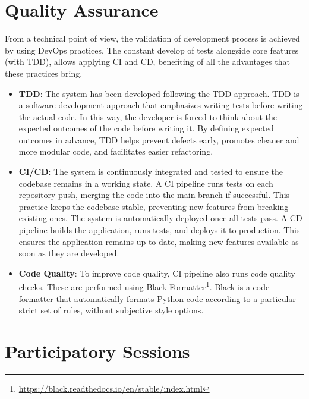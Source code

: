 \documentclass[12pt,a4paper,openright,twoside]{book}
\begin{document}
\section{Quality Assurance}

From a technical point of view, the validation of development process is achieved by using DevOps practices.
%
The constant develop of tests alongside core features (with \ac{TDD}), allows applying \ac{CI} and \acf{CD}, benefiting of all the advantages that these practices bring.

\begin{itemize}[label={}]
    \item \textbf{\acl{TDD}}:
    The system has been developed following the \ac{TDD} approach.
    \ac{TDD} is a software development approach that emphasizes writing tests before writing the actual code.
    In this way, the developer is forced to think about the expected outcomes of the code before writing it.
    By defining expected outcomes in advance, TDD helps prevent defects early, promotes cleaner and more modular code, and facilitates easier refactoring.

    \item \textbf{\ac{CI}/\ac{CD}}:  
    The system is continuously integrated and tested to ensure the codebase remains in a working state.
    A CI pipeline runs tests on each repository push, merging the code into the main branch if successful.
    This practice keeps the codebase stable, preventing new features from breaking existing ones.
    The system is automatically deployed once all tests pass.
    A CD pipeline builds the application, runs tests, and deploys it to production.
    This ensures the application remains up-to-date, making new features available as soon as they are developed.

    \item \textbf{Code Quality}:
    To improve code quality, \ac{CI} pipeline also runs code quality checks.
    These are performed using Black Formatter\footnote{\href{https://black.readthedocs.io/en/stable/index.html}{https://black.readthedocs.io/en/stable/index.html}}.
    Black is a code formatter that automatically formats Python code according to a particular strict set of rules, without subjective style options.
\end{itemize}



\section{Participatory Sessions}
\end{document}
